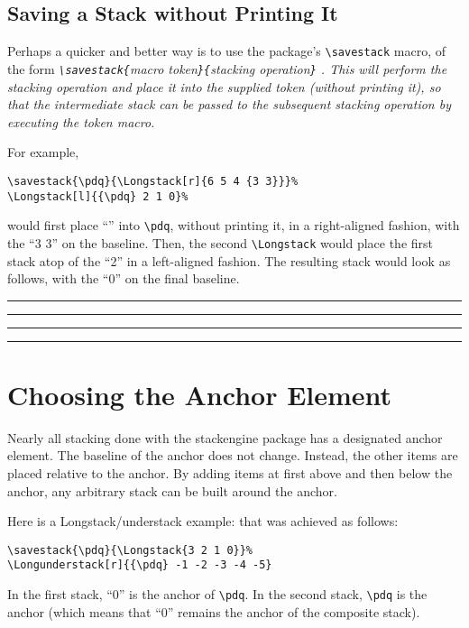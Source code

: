 \documentclass{article}
\def\rl{\rule[-.3pt]{2ex}{.6pt}}
\let\vb\verb
\def\blmark{\rl\stackengine{-.9ex}{B}{\rule{.35ex}{0pt}L}{U}{l}{F}{T}{S}\rl}
\begin{document}
\subsection{Saving a Stack without Printing It\label{s:svs}}

Perhaps a quicker and better way is to use the package's
\vb|\savestack| macro, of the form
\itshape\vb|\savestack{|macro token\vb|}{|stacking operation\vb|}|
\upshape.  This will perform the stacking operation and place it into
the supplied token (without printing it), so that the intermediate stack
can be passed to the subsequent stacking operation by executing the
token macro.

For example,
\begin{verbatim}
\savestack{\pdq}{\Longstack[r]{6 5 4 {3 3}}}%
\Longstack[l]{{\pdq} 2 1 0}%
\end{verbatim}

would first place ``'' into \vb|\pdq|, without
printing it, in a right-aligned fashion, with the ``3 3'' on the
baseline.  Then, the second \vb|\Longstack| would place the first stack
atop of the ``2'' in a left-aligned fashion.  The resulting stack would
look as follows, with the ``0'' on the final baseline.

%
\rl\rl\blmark%

\section{Choosing the Anchor Element\label{s:cae}}

Nearly all stacking done with the \textsf{stackengine} package has 
a designated anchor element.  The baseline of the anchor does not 
change.  Instead, the other items are placed relative to the anchor.
By adding items at first above and then below the anchor, any
arbitrary stack can be built around the anchor.

\def\stackalignment{r}
%
Here is a Longstack/understack example:
%
that was achieved as follows:

\begin{verbatim}
\savestack{\pdq}{\Longstack{3 2 1 0}}%
\Longunderstack[r]{{\pdq} -1 -2 -3 -4 -5}
\end{verbatim}

In the first stack, ``0'' is the anchor of \vb|\pdq|.  In the second
stack, \vb|\pdq| is the anchor (which means that ``0'' remains the
anchor of the composite stack).
\end{document}
